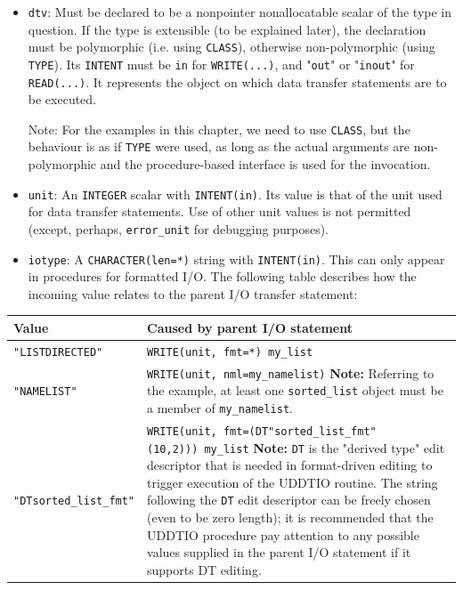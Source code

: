\documentclass[]{scrartcl}
\begin{document}
\begin{itemize}
\item
  \texttt{dtv}: Must be declared to be a nonpointer nonallocatable
  scalar of the type in question. If the type is extensible (to be
  explained later), the declaration must be polymorphic (i.e. using
  \texttt{CLASS}), otherwise non-polymorphic (using \texttt{TYPE}). Its
  \texttt{INTENT} must be \texttt{in} for \texttt{WRITE(...)}, and
  "\texttt{out}" or "\texttt{inout}" for \texttt{READ(...)}. It
  represents the object on which data transfer statements are to be
  executed.

  Note: For the examples in this chapter, we need to use \texttt{CLASS},
  but the behaviour is as if \texttt{TYPE} were used, as long as the
  actual arguments are non-polymorphic and the procedure-based interface
  is used for the invocation.
\item
  \texttt{unit}: An \texttt{INTEGER} scalar with \texttt{INTENT(in)}.
  Its value is that of the unit used for data transfer statements. Use
  of other unit values is not permitted (except, perhaps,
  \texttt{error\_unit} for debugging purposes).
\item
  \texttt{iotype}: A \texttt{CHARACTER(len=*)} string with
  \texttt{INTENT(in)}. This can only appear in procedures for formatted
  I/O. The following table describes how the incoming value relates to
  the parent I/O transfer statement:
\end{itemize}

\begin{longtable}[]{@{}ll@{}}
\toprule\noalign{}
Value & Caused by parent I/O statement \\
\midrule\noalign{}
\endhead
\bottomrule\noalign{}
\endlastfoot
\texttt{"LISTDIRECTED"} & \texttt{WRITE(unit,\ fmt=*)\ my\_list} \\
\texttt{"NAMELIST"} & \texttt{WRITE(unit,\ nml=my\_namelist)}
\textbf{Note:} Referring to the example, at least one
\texttt{sorted\_list} object must be a member of
\texttt{my\_namelist}. \\
\texttt{"DTsorted\_list\_fmt"} &
\texttt{WRITE(unit,\ fmt=\textquotesingle{}(DT"sorted\_list\_fmt"(10,2))\textquotesingle{})\ my\_list}
\textbf{Note:} \texttt{DT} is the "derived type" edit descriptor that is
needed in format-driven editing to trigger execution of the UDDTIO
routine. The string following the \texttt{DT} edit descriptor can be
freely chosen (even to be zero length); it is recommended that the
UDDTIO procedure pay attention to any possible values supplied in the
parent I/O statement if it supports DT editing. \\
\end{longtable}
\end{document}
